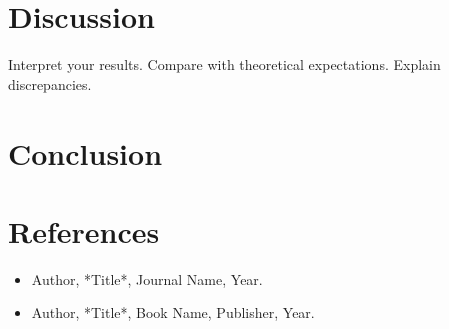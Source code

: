 \documentclass[12pt]{article}
\begin{document}
\section{Discussion}\label{sec:discussion}
Interpret your results.
Compare with theoretical expectations.
Explain discrepancies.

\section{Conclusion}\label{sec:conclusion}



\section*{References}
\begin{itemize}
    \item Author, *Title*, Journal Name, Year.
    \item Author, *Title*, Book Name, Publisher, Year.
\end{itemize}
\end{document}
